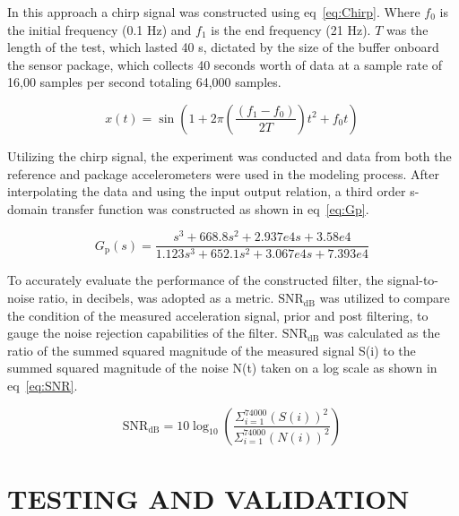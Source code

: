 \documentclass[]{spie}  %
\begin{document}
	In this approach a chirp signal was constructed using eq~\ref{eq:Chirp}. Where $f_0$ is the initial frequency (0.1 Hz) and $f_1$ is the end frequency (21 Hz). $T$ was the length of the test, which lasted 40 s, dictated by the size of the buffer onboard the sensor package, which collects 40 seconds worth of data at a sample rate of 16,00 samples per second totaling 64,000 samples.
	
	\begin{equation} 
		\label{eq:Chirp}
		x(t)=\sin(1 + 2\pi ( \frac{(f_1-f_0)}{2T} ) t^2 + f_0 t) \, 
	\end{equation}
	

	
	Utilizing the chirp signal, the experiment was conducted and data from both the reference and package accelerometers were used in the modeling process. After interpolating the data and using the input output relation, a third order s-domain transfer function was constructed as shown in eq~\ref{eq:Gp}. 
	
	\begin{equation}
		\label{eq:Gp}
		G_\text{p}(s) = \frac{s^3  + 668.8 s^2  + 2.937e4 s + 3.58e4}{1.123 s^3  + 652.1 s^2  + 3.067e4 s + 7.393e4} \, 
	\end{equation}

To accurately evaluate the performance of the constructed filter, the signal-to-noise ratio, in decibels, was adopted as a metric. $\text{SNR}_{\text{dB}}$ was utilized to compare the condition of the measured acceleration signal, prior and post filtering, to gauge the noise rejection capabilities of the filter. $\text{SNR}_{\text{dB}}$ was calculated as the ratio of the summed squared magnitude of the measured signal S(i) to the summed squared magnitude of the noise N(t) taken on a log scale as shown in eq~\ref{eq:SNR}.~\cite{Johnson2006}

	\begin{equation}
		\label{eq:SNR}
		\text{SNR}_{\text{dB}} =10 \log_{10}(\frac{\Sigma^{74000}_{i=1}(S(i))^2}{\Sigma^{74000}_{i=1}(N(i))^2}) \, 
	\end{equation}

	
	\section{TESTING AND VALIDATION}
	
\end{document}
